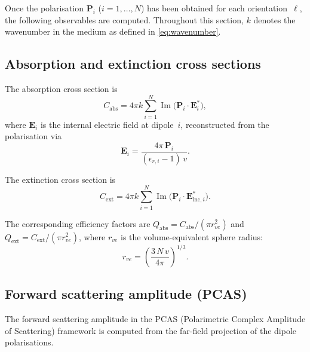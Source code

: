 \documentclass[11pt,a4paper]{article}
\begin{document}
Once the polarisation $\bm{P}_i$ ($i = 1, \ldots, N$) has been obtained
for each orientation~$\ell$, the following observables are computed.
Throughout this section, $k$ denotes the wavenumber in the medium as
defined in \eqref{eq:wavenumber}.

\subsection{Absorption and extinction cross sections}
\label{sec:cross-sections}

The absorption cross section is~\cite{Draine1988}
\begin{equation}
  C_{\text{abs}}
    = 4\pi k \sum_{i=1}^{N}
      \operatorname{Im}\!\bigl(\bm{P}_i \cdot \bm{E}_i^*\bigr),
  \label{eq:C-abs}
\end{equation}
where $\bm{E}_i$ is the internal electric field at dipole~$i$,
reconstructed from the polarisation via
\begin{equation}
  \bm{E}_i
    = \frac{4\pi\,\bm{P}_i}{(\epsilon_{r,i} - 1)\,v}.
  \label{eq:E-from-P}
\end{equation}

The extinction cross section is
\begin{equation}
  C_{\text{ext}}
    = 4\pi k \sum_{i=1}^{N}
      \operatorname{Im}\!\bigl(\bm{P}_i \cdot \bm{E}_{\text{inc},i}^*\bigr).
  \label{eq:C-ext}
\end{equation}

The corresponding efficiency factors are
$Q_{\text{abs}} = C_{\text{abs}} / (\pi r_{ve}^2)$ and
$Q_{\text{ext}} = C_{\text{ext}} / (\pi r_{ve}^2)$,
where $r_{ve}$ is the volume-equivalent sphere radius:
\begin{equation}
  r_{ve} = \left(\frac{3\,N\,v}{4\pi}\right)^{\!1/3}.
  \label{eq:r-ve}
\end{equation}

\subsection{Forward scattering amplitude (PCAS)}
\label{sec:S-fw}

The forward scattering amplitude in the PCAS (Polarimetric Complex
Amplitude of Scattering) framework is computed from the far-field
projection of the dipole polarisations.
\end{document}
